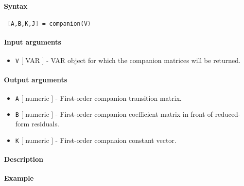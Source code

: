 


	\paragraph{Syntax}
 
 \begin{verbatim}
 [A,B,K,J] = companion(V)
 \end{verbatim}
 
 \paragraph{Input arguments}
 
 \begin{itemize}
 \item
   \texttt{V} {[} VAR {]} - VAR object for which the companion matrices
   will be returned.
 \end{itemize}
 
 \paragraph{Output arguments}
 
 \begin{itemize}
 \item
   \texttt{A} {[} numeric {]} - First-order companion transition matrix.
 \item
   \texttt{B} {[} numeric {]} - First-order companion coefficient matrix
   in front of reduced-form residuals.
 \item
   \texttt{K} {[} numeric {]} - First-order compnaion constant vector.
 \end{itemize}
 
 \paragraph{Description}
 
 \paragraph{Example}



